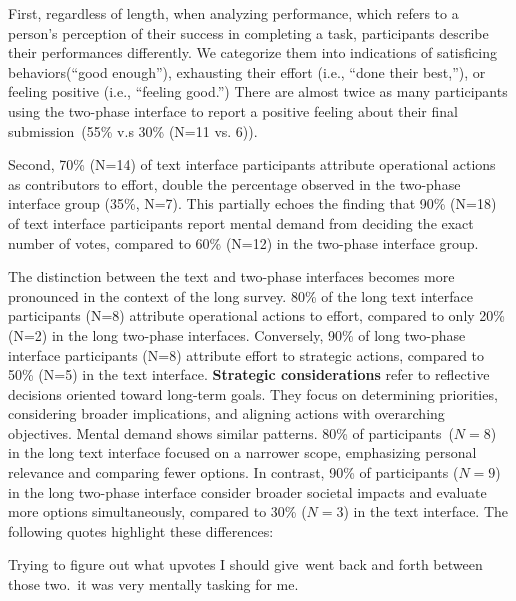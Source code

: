 First, regardless of length, when analyzing performance, which refers to a person's perception of their success in completing a task, participants describe their performances differently. We categorize them into indications of satisficing behaviors(``good enough''), exhausting their effort (i.e., ``done their best,''), or feeling positive (i.e., ``feeling good.'') There are almost twice as many participants using the two-phase interface to report a positive feeling about their final submission~(55\% v.s 30\% (N=11 vs. 6)).

Second, 70\% (N=14) of text interface participants attribute operational actions as contributors to effort, double the percentage observed in the two-phase interface group (35\%, N=7). This partially echoes the finding that 90\% (N=18) of text interface participants report mental demand from deciding the exact number of votes, compared to 60\% (N=12) in the two-phase interface group.


The distinction between the text and two-phase interfaces becomes more pronounced in the context of the long survey. 80\% of the long text interface participants (N=8) attribute operational actions to effort, compared to only 20\% (N=2) in the long two-phase interfaces. Conversely, 90\% of long two-phase interface participants (N=8) attribute effort to strategic actions, compared to 50\% (N=5) in the text interface. \textbf{Strategic considerations} refer to reflective decisions oriented toward long-term goals. They focus on determining priorities, considering broader implications, and aligning actions with overarching objectives. Mental demand shows similar patterns. 80\% of participants~($N=8$) in the long text interface focused on a narrower scope, emphasizing personal relevance and comparing fewer options. In contrast, 90\% of participants ($N=9$) in the long two-phase interface consider broader societal impacts and evaluate more options simultaneously, compared to 30\% ($N=3$) in the text interface. The following quotes highlight these differences:

\begin{displayquote}
Trying to figure out what upvotes I should give~\bracketellipsis went back and forth between those two.~\bracketellipsis it was very mentally tasking for me. \hfill{}
\end{displayquote}

